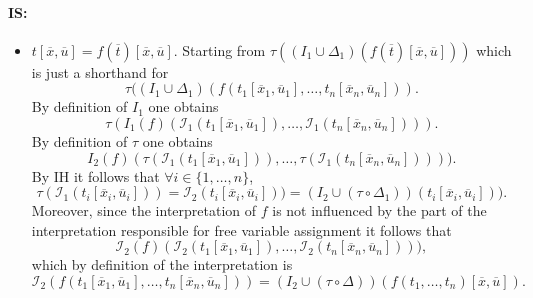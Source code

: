 \documentclass[11pt,a4paper]{article}
\begin{document}
\paragraph*{IS:}
\begin{itemize}[leftmargin=*]
\item $t[\overline{x},\overline{u}]=f(\overline{t})[\overline{x},\overline{u}]$. Starting from $\tau((I_1 \cup \Delta_1)(f(\overline{t})[\overline{x},\overline{u}]))$ which is just a shorthand for 
\begin{equation*}
\tau((I_1 \cup \Delta_1)(f(t_1[\overline{x}_1,\overline{u}_1], \dots, t_n[\overline{x}_n,\overline{u}_n])).
\end{equation*} 
By definition of $I_1$ one obtains 
\begin{equation*}
\tau(I_1(f)(\mathcal{I}_1(t_1[\overline{x}_1,\overline{u}_1]), \dots, \mathcal{I}_1(t_n[\overline{x}_n,\overline{u}_n]))).
\end{equation*} 
By definition of $\tau$ one obtains 
\begin{equation*}
I_2(f)(\tau(\mathcal{I}_1(t_1[\overline{x}_1,\overline{u}_1])), \dots, \tau(\mathcal{I}_1(t_n[\overline{x}_n,\overline{u}_n])))).
\end{equation*}
 By IH it follows that $\forall i \in \{1,\dots ,n\}$,
\begin{equation*}
\tau(\mathcal{I}_1(t_i[\overline{x}_i,\overline{u}_i])) = \mathcal{I}_2(t_i[\overline{x}_i,\overline{u}_i])) = (I_2\cup (\tau \circ \Delta_1))(t_i[\overline{x}_i,\overline{u}_i])).
\end{equation*}
Moreover, since the interpretation of $f$ is not influenced by the part of the interpretation responsible for free variable assignment it follows that 
\begin{equation*}
\mathcal{I}_2(f)(\mathcal{I}_2(t_1[\overline{x}_1,\overline{u}_1]), \dots, \mathcal{I}_2(t_n[\overline{x}_n,\overline{u}_n]))),
\end{equation*}
which by definition of the interpretation is 
\begin{equation*}
\mathcal{I}_2(f(t_1[\overline{x}_1,\overline{u}_1], \dots, t_n[\overline{x}_n,\overline{u}_n]))= (I_2 \cup (\tau \circ \Delta))(f(t_1, \dots, t_n)[\overline{x},\overline{u}]).
\end{equation*}\\


\end{itemize}
\end{document}
